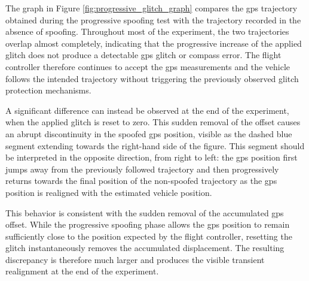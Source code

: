 The graph in Figure \ref{fig:progressive_glitch_graph} compares the \gls{gps} trajectory obtained during the progressive spoofing test with the trajectory recorded in the absence of spoofing.
Throughout most of the experiment, the two trajectories overlap almost completely, indicating that the progressive increase of the applied glitch does not produce a detectable \gls{gps} glitch or compass error.
The flight controller therefore continues to accept the \gls{gps} measurements and the vehicle follows the intended trajectory without triggering the previously observed glitch protection mechanisms.

A significant difference can instead be observed at the end of the experiment, when the applied glitch is reset to zero.
This sudden removal of the offset causes an abrupt discontinuity in the spoofed \gls{gps} position, visible as the dashed blue segment extending towards the right-hand side of the figure.
This segment should be interpreted in the opposite direction, from right to left: the \gls{gps} position first jumps away from the previously followed trajectory and then progressively returns towards the final position of the non-spoofed trajectory as the \gls{gps} position is realigned with the estimated vehicle position.

This behavior is consistent with the sudden removal of the accumulated \gls{gps} offset.
While the progressive spoofing phase allows the \gls{gps} position to remain sufficiently close to the position expected by the flight controller, resetting the glitch instantaneously removes the accumulated displacement.
The resulting discrepancy is therefore much larger and produces the visible transient realignment at the end of the experiment.